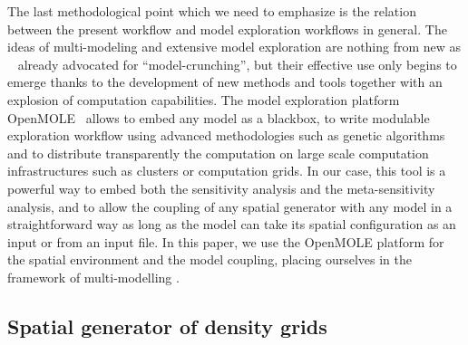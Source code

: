 \documentclass[preprint,5p,times,twocolumn,authoryear]{elsarticle}
\begin{document}
The last methodological point which we need to emphasize is the relation between the present workflow and model exploration workflows in general. The ideas of multi-modeling and extensive model exploration are nothing from new as ~\cite{openshaw1983data} already advocated for ``model-crunching'', but their effective use only begins to emerge thanks to the development of new methods and tools together with an explosion of computation capabilities. The model exploration platform OpenMOLE~\citep{reuillon2013openmole} allows to embed any model as a blackbox, to write modulable exploration workflow using advanced methodologies such as genetic algorithms and to distribute transparently the computation on large scale computation infrastructures such as clusters or computation grids. In our case, this tool is a powerful way to embed both the sensitivity analysis and the meta-sensitivity analysis, and to allow the coupling of any spatial generator with any model in a straightforward way as long as the model can take its spatial configuration as an input or from an input file. In this paper, we use the OpenMOLE platform for the spatial environment and the model coupling, placing ourselves in the  framework of multi-modelling \citep{cottineau2015modular}. 


\subsection{Spatial generator of density grids}
\end{document}
